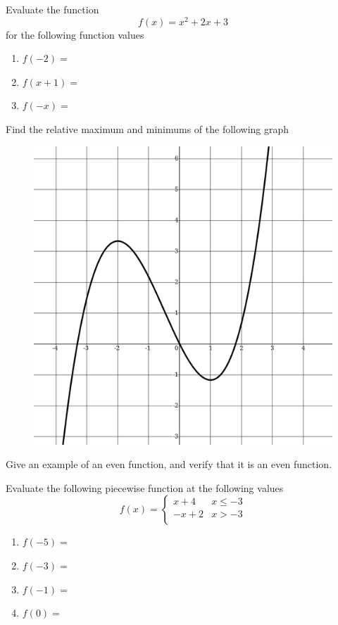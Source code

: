 \documentclass[addpoints,12pt]{exam}
\begin{document}
\begin{questions}
\question Evaluate the function
\[
f(x)=x^{2}+2x+3
\]
for the following function values 
\begin{enumerate}[label = \alph*)]
    \item $f(-2)=$ 
		\item $f(x+1)=$
		\item $f(-x)=$
\end{enumerate}

\question Find the relative maximum and minimums of the following graph 

\begin{figure}[htb!]
  \centering
  \includegraphics[scale = 0.1]{minmax}
\end{figure}

\question Give an example of an even function, and verify that it is an even function. 

\question Evaluate the following piecewise function at the following values
\[
	f(x) =
	\begin{cases}
   x+4 & x\leq -3 \\
	 -x+2 & x> -3 \\
	\end{cases}
\]

\begin{enumerate}
    \item $f(-5)=$
		\item $f(-3) = $
		\item $f(-1)= $
		\item $f(0)=$
\end{enumerate}

\end{questions}
\end{document}
